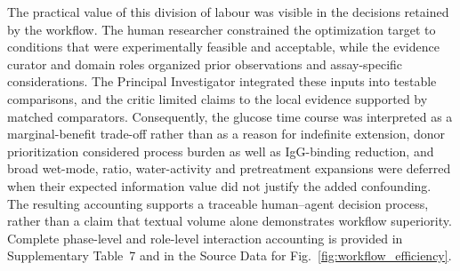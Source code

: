 The practical value of this division of labour was visible in the decisions retained by the workflow. The human researcher constrained the optimization target to conditions that were experimentally feasible and acceptable, while the evidence curator and domain roles organized prior observations and assay-specific considerations. The Principal Investigator integrated these inputs into testable comparisons, and the critic limited claims to the local evidence supported by matched comparators. Consequently, the glucose time course was interpreted as a marginal-benefit trade-off rather than as a reason for indefinite extension, donor prioritization considered process burden as well as IgG-binding reduction, and broad wet-mode, ratio, water-activity and pretreatment expansions were deferred when their expected information value did not justify the added confounding. The resulting accounting supports a traceable human--agent decision process, rather than a claim that textual volume alone demonstrates workflow superiority.
Complete phase-level and role-level interaction accounting is provided in Supplementary Table~7 and in the Source Data for Fig.~\ref{fig:workflow_efficiency}.

